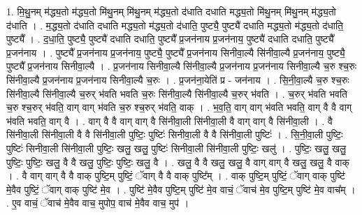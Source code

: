 \documentclass[17pt]{extarticle}
\begin{document}
1. मि॒थु॒नम् म॑द्ध्य॒तो म॑द्ध्य॒तो मि॑थु॒नम् मि॑थु॒नम् म॑द्ध्य॒तो द॑धाति दधाति मद्ध्य॒तो मि॑थु॒नम् मि॑थु॒नम् म॑द्ध्य॒तो द॑धाति । . म॒द्ध्य॒तो द॑धाति दधाति मद्ध्य॒तो म॑द्ध्य॒तो द॑धाति॒ पुष्ट्यै॒ पुष्ट्यै॑ दधाति मद्ध्य॒तो म॑द्ध्य॒तो द॑धाति॒ पुष्ट्यै᳚ । . द॒धा॒ति॒ पुष्ट्यै॒ पुष्ट्यै॑ दधाति दधाति॒ पुष्ट्यै᳚ प्र॒जन॑नाय प्र॒जन॑नाय॒ पुष्ट्यै॑ दधाति दधाति॒ पुष्ट्यै᳚ प्र॒जन॑नाय । . पुष्ट्यै᳚ प्र॒जन॑नाय प्र॒जन॑नाय॒ पुष्ट्यै॒ पुष्ट्यै᳚ प्र॒जन॑नाय सिनीवा॒ल्यै सि॑नीवा॒ल्यै प्र॒जन॑नाय॒ पुष्ट्यै॒ पुष्ट्यै᳚ प्र॒जन॑नाय सिनीवा॒ल्यै । . प्र॒जन॑नाय सिनीवा॒ल्यै सि॑नीवा॒ल्यै प्र॒जन॑नाय प्र॒जन॑नाय सिनीवा॒ल्यै च॒रु श्च॒रुः सि॑नीवा॒ल्यै प्र॒जन॑नाय प्र॒जन॑नाय सिनीवा॒ल्यै च॒रुः । . प्र॒जन॑ना॒येति॑ प्र - जन॑नाय । . सि॒नी॒वा॒ल्यै च॒रु श्च॒रुः सि॑नीवा॒ल्यै सि॑नीवा॒ल्यै च॒रुर् भ॑वति भवति च॒रुः सि॑नीवा॒ल्यै सि॑नीवा॒ल्यै च॒रुर् भ॑वति । . च॒रुर् भ॑वति भवति च॒रु श्च॒रुर् भ॑वति॒ वाग् वाग् भ॑वति च॒रु श्च॒रुर् भ॑वति॒ वाक् । . भ॒व॒ति॒ वाग् वाग् भ॑वति भवति॒ वाग् वै वै वाग् भ॑वति भवति॒ वाग् वै । . वाग् वै वै वाग् वाग् वै सि॑नीवा॒ली सि॑नीवा॒ली वै वाग् वाग् वै सि॑नीवा॒ली । . वै सि॑नीवा॒ली सि॑नीवा॒ली वै वै सि॑नीवा॒ली पुष्टिः॒ पुष्टिः॑ सिनीवा॒ली वै वै सि॑नीवा॒ली पुष्टिः॑ । . सि॒नी॒वा॒ली पुष्टिः॒ पुष्टिः॑ सिनीवा॒ली सि॑नीवा॒ली पुष्टिः॒ खलु॒ खलु॒ पुष्टिः॑ सिनीवा॒ली सि॑नीवा॒ली पुष्टिः॒ खलु॑ । . पुष्टिः॒ खलु॒ खलु॒ पुष्टिः॒ पुष्टिः॒ खलु॒ वै वै खलु॒ पुष्टिः॒ पुष्टिः॒ खलु॒ वै । . खलु॒ वै वै खलु॒ खलु॒ वै वाग् वाग् वै खलु॒ खलु॒ वै वाक् । . वै वाग् वाग् वै वै वाक् पुष्टि॒म् पुष्टिं॒ ॅवाग् वै वै वाक् पुष्टि᳚म् । . वाक् पुष्टि॒म् पुष्टिं॒ ॅवाग् वाक् पुष्टि॑ मे॒वैव पुष्टिं॒ ॅवाग् वाक् पुष्टि॑ मे॒व । . पुष्टि॑ मे॒वैव पुष्टि॒म् पुष्टि॑ मे॒व वाचं॒ ॅवाच॑ मे॒व पुष्टि॒म् पुष्टि॑ मे॒व वाच᳚म् । . ए॒व वाचं॒ ॅवाच॑ मे॒वैव वाच॒ मुपोप॒ वाच॑ मे॒वैव वाच॒ मुप॑ । \newline
\end{document}
